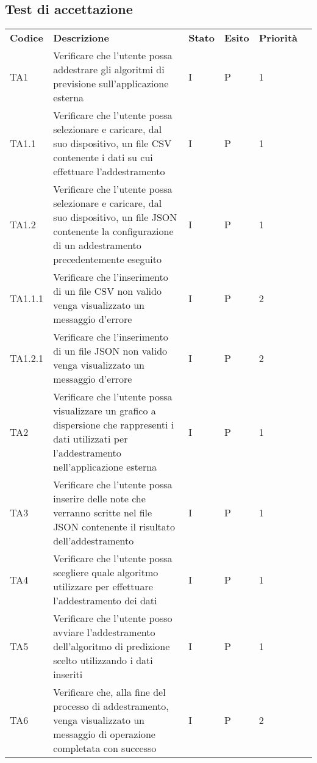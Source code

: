 \subsection{Test di accettazione}

\setcounter{table}{0}
\begin{longtable} {
	>{}p{12mm}
	>{}p{79.5mm}
	>{}p{9mm}
	>{}p{8mm}
	>{}p{14mm}
	>{}p{0mm}}
	\rowcolor{gray!50}
	\textbf{Codice} & \textbf{Descrizione} & \textbf{Stato} & \textbf{Esito} & \textbf{Priorità} & \TBstrut \\
	TA1 & Verificare che l'utente possa addestrare gli algoritmi di previsione sull'applicazione esterna & I & P & 1 & \TBstrut \\ [2mm]
	TA1.1 & Verificare che l'utente possa selezionare e caricare, dal suo dispositivo, un file CSV contenente i dati su cui effettuare l'addestramento & I & P & 1 & \TBstrut \\ [2mm]
	TA1.2 & Verificare che l'utente possa selezionare e caricare, dal suo dispositivo, un file JSON contenente la configurazione di un addestramento precedentemente eseguito & I & P & 1 & \TBstrut \\ [2mm]
	TA1.1.1 & Verificare che l'inserimento di un file CSV non valido venga visualizzato un messaggio d'errore & I & P & 2 & \TBstrut \\ [2mm]
	TA1.2.1 & Verificare che l'inserimento di un file JSON non valido venga visualizzato un messaggio d'errore & I & P & 2 & \TBstrut \\ [2mm]
	TA2 & Verificare che l'utente possa visualizzare un grafico a dispersione che rappresenti i dati utilizzati per l'addestramento nell'applicazione esterna & I & P & 1 & \TBstrut \\ [2mm]
	TA3 & Verificare che l'utente possa inserire delle note che verranno scritte nel file JSON contenente il risultato dell'addestramento & I & P & 1 & \TBstrut \\ [2mm]
	TA4 & Verificare che l'utente possa scegliere quale algoritmo utilizzare per effettuare l'addestramento dei dati & I & P & 1 & \TBstrut \\ [2mm]
	TA5 & Verificare che l'utente posso avviare l'addestramento dell'algoritmo di predizione scelto utilizzando i dati inseriti & I & P & 1 & \TBstrut \\ [2mm]
	TA6 & Verificare che, alla fine del processo di addestramento, venga visualizzato un messaggio di operazione completata con successo & I & P & 2 & \TBstrut \\ [2mm]

\end{longtable}
